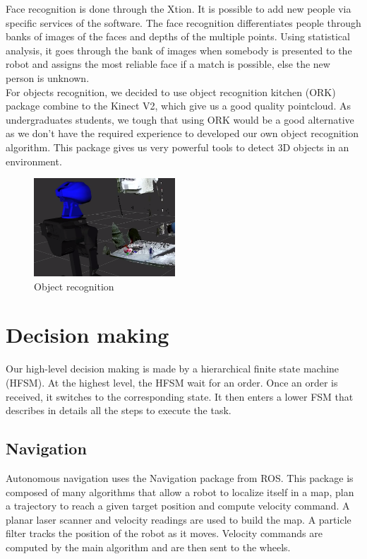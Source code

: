 \documentclass[runningheads,a4paper]{llncs}
\begin{document}
Face recognition is done through the Xtion. It is possible to add new people via specific services of the software. The face recognition differentiates people through banks of images of the faces and depths of the multiple points. Using statistical analysis, it goes through the bank of images when somebody is presented to the robot and assigns the most reliable face if a match is
possible, else the new person is unknown. \\

For objects recognition, we decided to use object recognition kitchen (ORK) \cite{ork} package combine  to the Kinect V2, which give us a good quality pointcloud. As undergraduates students, we tough that using ORK would be a good alternative as we don't have the required experience to developed our own object recognition algorithm. This package gives us very powerful tools to detect 3D objects in an environment. \\

\begin{figure}
  \centering
  \includegraphics[width=150pt]{images/objectreco.png}
  \caption{Object recognition}
\end{figure}

\section{Decision making}
\tab Our high-level decision making is made by a hierarchical finite state machine (HFSM). At the highest level, the HFSM wait for an order. Once an order is received, it switches to the corresponding state. It then enters a lower FSM that describes in details all the steps to execute the task. 

\subsection{Navigation}
\tab Autonomous navigation uses the Navigation package from ROS. This package is composed of many algorithms that allow a robot to localize itself in a map, plan a trajectory to reach a given target position and compute velocity command. A planar laser scanner and velocity readings are used to build the map. A particle filter tracks the position of the robot as it moves. Velocity commands are computed by the main algorithm and are then sent to the wheels. 
\end{document}

